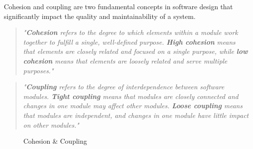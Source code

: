 {Cohesion and coupling are two fundamental concepts in software design that significantly impact the quality and maintainability of a system. \\

\begin{quote}
\textit{"\textbf{Cohesion} refers to the degree to which elements within a module work together to fulfill a single, well-defined purpose. \textbf{High cohesion} means that elements are closely related and focused on a single purpose, while \textbf{low cohesion} means that elements are loosely related and serve multiple purposes."} \cite{geeksforgeeks:c&c} \\
\end{quote}

\begin{quote}
\textit{"\textbf{Coupling} refers to the degree of interdependence between software modules. \textbf{Tight coupling} means that modules are closely connected and changes in one module may affect other modules. \textbf{Loose coupling} means that modules are independent, and changes in one module have little impact on other modules."} \cite{geeksforgeeks:c&c} \\
\end{quote}

\begin{figure}[h!]
    \centering

    \caption[Cohesion \& Coupling]{Cohesion \& Coupling \cite{geeksforgeeks:c&c}}
    \label{fig:cohesion-coupling}
\end{figure}

}
